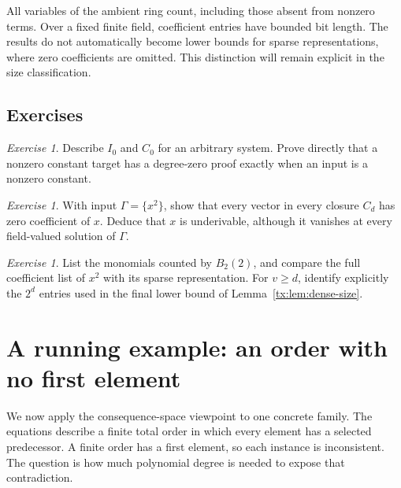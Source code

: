 \documentclass[11pt,a4paper,oneside,openany]{book}
\theoremstyle{definition}\newtheorem{definition}[theorem]{Definition}
\theoremstyle{remark}\newtheorem{remark}[theorem]{Remark}
\newtheorem{exercise}[theorem]{Exercise}
\numberwithin{equation}{chapter}
\begin{document}
All variables of the ambient ring count, including those absent from
nonzero terms. Over a fixed finite field, coefficient entries have
bounded bit length. The results do not automatically become lower
bounds for sparse representations, where zero coefficients are omitted.
This distinction will remain explicit in the size classification.

\section{Exercises}
\begin{exercise}\label{tx:ex:closure-zero}
Describe $I_0$ and $C_0$ for an arbitrary system. Prove directly that a
nonzero constant target has a degree-zero proof exactly when an input
is a nonzero constant.
\end{exercise}
\par\medskip

\begin{exercise}\label{tx:ex:closure-witness}
With input $\Gamma=\{x^2\}$, show that every vector in every closure
$C_d$ has zero coefficient of $x$. Deduce that $x$ is underivable,
although it vanishes at every field-valued solution of $\Gamma$.
\end{exercise}
\par\medskip

\begin{exercise}\label{tx:ex:dense-count}
List the monomials counted by $B_2(2)$, and compare the full coefficient
list of $x^2$ with its sparse representation. For $v\ge d$, identify
explicitly the $2^d$ entries used in the final lower bound of
Lemma~\ref{tx:lem:dense-size}.
\end{exercise}
\par\medskip


\chapter{A running example: an order with no first element}
\label{tx:ch:running-order}
We now apply the consequence-space viewpoint to one concrete family.
The equations describe a finite total order in which every element has
a selected predecessor. A finite order has a first element, so each
instance is inconsistent. The question is how much polynomial degree
is needed to expose that contradiction.
\end{document}
